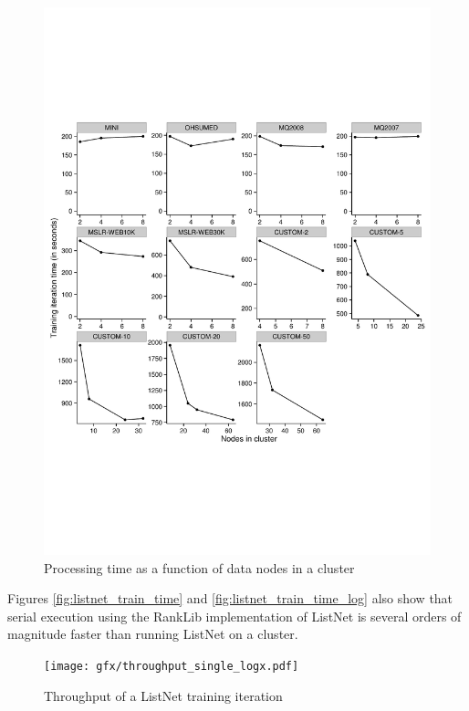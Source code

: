 \begin{figure}
\centering
\includegraphics[trim=0cm 5cm 0cm 5cm, scale=0.7]{gfx/speedup_faceted.pdf}
\caption{Processing time as a function of data nodes in a cluster}
\label{fig:speedup_train_time}
\end{figure}

Figures \ref{fig:listnet_train_time} and \ref{fig:listnet_train_time_log} also show that serial execution using the RankLib implementation of ListNet is several orders of magnitude faster than running ListNet on a cluster.
\begin{figure}
\centering
\texttt{[image: gfx/throughput\_single\_logx.pdf]}
\caption{Throughput of a ListNet training iteration}
\label{fig:listnet_throughput}
\end{figure}